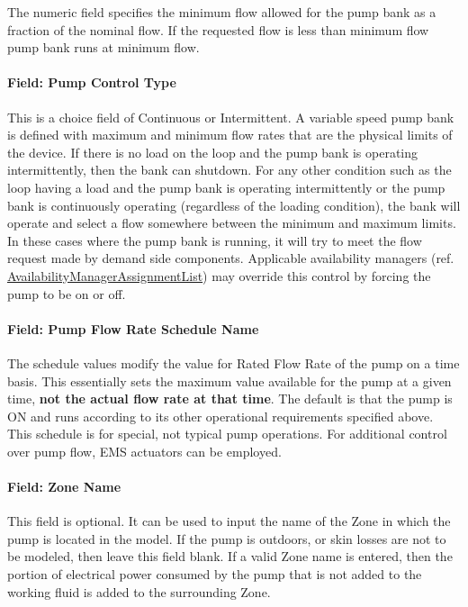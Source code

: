 The numeric field specifies the minimum flow allowed for the pump bank as a fraction of the nominal flow. If the requested flow is less than minimum flow pump bank runs at minimum flow.

\paragraph{Field: Pump Control Type}\label{field-pump-control-type-3}

This is a choice field of Continuous or Intermittent. A variable speed pump bank is defined with maximum and minimum flow rates that are the physical limits of the device. If there is no load on the loop and the pump bank is operating intermittently, then the bank can shutdown. For any other condition such as the loop having a load and the pump bank is operating intermittently or the pump bank is continuously operating (regardless of the loading condition), the bank will operate and select a flow somewhere between the minimum and maximum limits. In these cases where the pump bank is running, it will try to meet the flow request made by demand side components. Applicable availability managers (ref. \hyperref[availabilitymanagerassignmentlist]{AvailabilityManagerAssignmentList}) may override this control by forcing the pump to be on or off.

\paragraph{Field: Pump Flow Rate Schedule Name}\label{field-pump-flow-rate-schedule-name-4}

The schedule values modify the value for Rated Flow Rate of the pump on a time basis. This essentially sets the maximum value available for the pump at a given time, \textbf{not the actual flow rate at that time}. The default is that the pump is ON and runs according to its other operational requirements specified above. This schedule is for special, not typical pump operations. For additional control over pump flow, EMS actuators can be employed.

\paragraph{Field: Zone Name}\label{field-zone-name-4-003}

This field is optional. It can be used to input the name of the Zone in which the pump is located in the model. If the pump is outdoors, or skin losses are not to be modeled, then leave this field blank. If a valid Zone name is entered, then the portion of electrical power consumed by the pump that is not added to the working fluid is added to the surrounding Zone.

